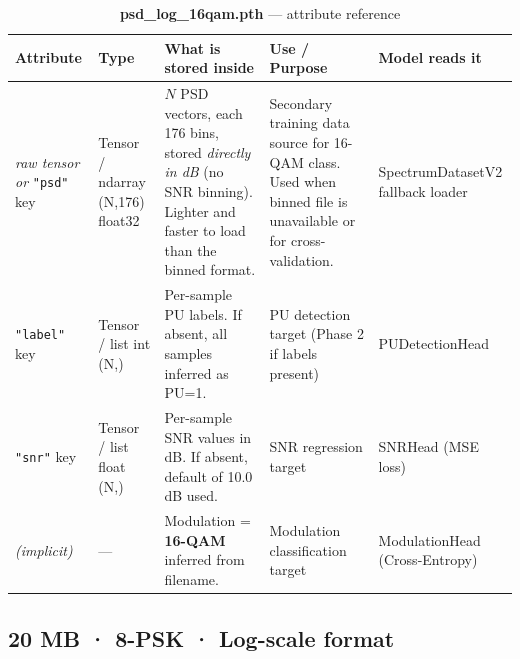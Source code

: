 \documentclass[11pt,a4paper]{article}
\begin{document}
\begin{table}[h!]
\centering
\caption{\textbf{psd\_log\_16qam.pth} — attribute reference}
\renewcommand{\arraystretch}{1.55}
\begin{tabularx}{\textwidth}{>{\ttfamily\small}l l X l l}
\toprule
\textbf{Attribute} & \textbf{Type} & \textbf{What is stored inside} & \textbf{Use / Purpose} & \textbf{Model reads it} \\
\midrule

\textit{raw tensor or}
\texttt{"psd"} key
  & Tensor / ndarray (N,176) float32
  & $N$ PSD vectors, each 176 bins, stored \emph{directly in dB}
    (no SNR binning). Lighter and faster to load than the binned format.
  & Secondary training data source for 16-QAM class.
    Used when binned file is unavailable or for cross-validation.
  & SpectrumDatasetV2 fallback loader \\[6pt]

\texttt{"label"} key
  & Tensor / list int (N,)
  & Per-sample PU labels. If absent, all samples inferred as PU=1.
  & PU detection target (Phase 2 if labels present)
  & PUDetectionHead \\[6pt]

\texttt{"snr"} key
  & Tensor / list float (N,)
  & Per-sample SNR values in dB. If absent, default of 10.0 dB used.
  & SNR regression target
  & SNRHead (MSE loss) \\[6pt]

\textit{(implicit)}
  & —
  & Modulation = \textbf{16-QAM} inferred from filename.
  & Modulation classification target
  & ModulationHead (Cross-Entropy) \\

\bottomrule
\end{tabularx}
\end{table}

\subsection*{
\hfill\small 20 MB · 8-PSK · Log-scale format}
\end{document}
